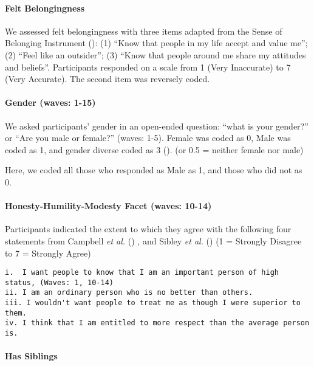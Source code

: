 \documentclass[
  singlecolumn]{article}
\let\oldparagraph\paragraph
\renewcommand{\paragraph}[1]{\oldparagraph{#1}\mbox{}}
\begin{document}
\paragraph{Felt Belongingness}\label{felt-belongingness}

We assessed felt belongingness with three items adapted from the Sense
of Belonging Instrument (): (1) ``Know that people in my life accept and value me''; (2)
``Feel like an outsider''; (3) ``Know that people around me share my
attitudes and beliefs''. Participants responded on a scale from 1 (Very
Inaccurate) to 7 (Very Accurate). The second item was reversely coded.

\paragraph{Gender (waves: 1-15)}\label{gender-waves-1-15}

We asked participants' gender in an open-ended question: ``what is your
gender?'' or ``Are you male or female?'' (waves: 1-5). Female was coded
as 0, Male was coded as 1, and gender diverse coded as 3
(). (or 0.5
= neither female nor male)

Here, we coded all those who responded as Male as 1, and those who did
not as 0.

\paragraph{Honesty-Humility-Modesty Facet (waves:
10-14)}\label{honesty-humility-modesty-facet-waves-10-14}

Participants indicated the extent to which they agree with the following
four statements from Campbell \emph{et al.}
() , and Sibley \emph{et al.}
() (1 = Strongly Disagree to 7 = Strongly
Agree)

\begin{verbatim}
i.  I want people to know that I am an important person of high status, (Waves: 1, 10-14)
ii. I am an ordinary person who is no better than others.
iii. I wouldn't want people to treat me as though I were superior to them.
iv. I think that I am entitled to more respect than the average person is.
\end{verbatim}

\paragraph{Has Siblings}\label{has-siblings}
\end{document}
